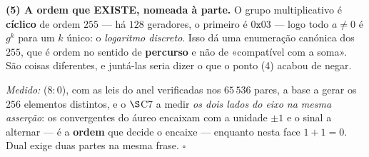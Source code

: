 \documentclass[livro.tex]{subfiles}
\begin{document}
\begin{teorema}
\textbf{(5) A ordem que EXISTE, nomeada à parte.} O grupo multiplicativo
é \textbf{cíclico} de ordem $255$ --- há $128$ geradores, o primeiro é
$0\mathtt{x}03$ --- logo todo $a\neq0$ é $g^{k}$ para um $k$ único: o
\emph{logaritmo discreto}. Isso dá uma enumeração canónica dos $255$,
que é ordem no sentido de \textbf{percurso} e não de «compatível com a
soma». São coisas diferentes, e juntá-las seria dizer o que o ponto (4)
acabou de negar.

\emph{Medido:}  ($8{:}0$), com as leis do anel
verificadas nos $65\,536$ pares, a base a gerar os $256$ elementos
distintos, e o $\S$C7 a medir \emph{os dois lados do eixo na mesma
asserção}: os convergentes do áureo encaixam com a unidade $\pm1$ e o
sinal a alternar --- é a \textbf{ordem} que decide o encaixe --- enquanto
nesta face $1+1=0$. Dual exige duas partes na mesma frase. $\square$
\end{teorema}
\end{document}
